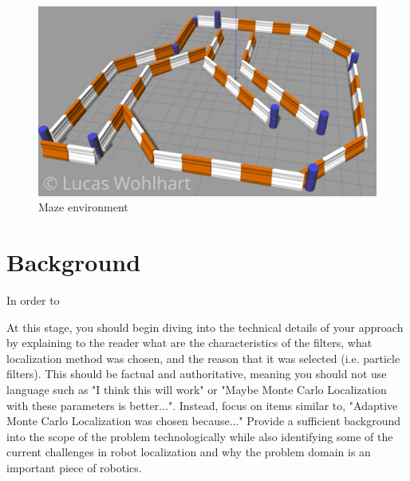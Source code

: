 \documentclass[10pt,journal,compsoc]{IEEEtran}
\begin{document}
\begin{figure}[thpb]
      \centering
      \includegraphics[width=\linewidth]{maze_world}
      \caption{Maze environment}
      \label{fig:maze}
\end{figure}





\section{Background}
In order to 

At this stage, you should begin diving into the technical details of your approach by explaining to the reader what are the characteristics of the filters, what localization method was chosen, and the reason that it was selected (i.e. particle filters). 
This should be factual and authoritative, meaning you should not use language such as "I think this will work" or "Maybe Monte Carlo Localization with these parameters is better...". Instead, focus on items similar to, "Adaptive Monte Carlo Localization was chosen because..."
Provide a sufficient background into the scope of the problem technologically while also identifying some of the current challenges in robot localization and why the problem domain is an important piece of robotics.\cite{lamport1994latex}
\end{document}
